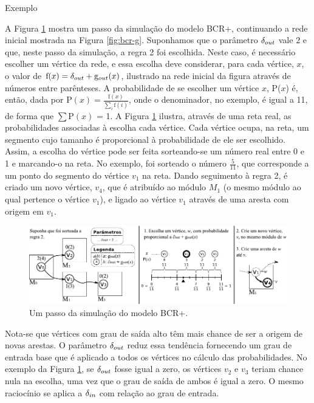 \begin{section}{Exemplo}

A Figura \ref{fig:bcr-passo} mostra um passo da simulação do modelo BCR+, continuando a rede inicial mostrada na Figura \ref{fig:bcr-g}. Suponhamos que o parâmetro $\delta_{out}$ vale $2$ e que, neste passo da simulação, a regra 2 foi escolhida. Neste caso, é necessário escolher um vértice da rede, e essa escolha deve considerar, para cada vértice, $x$, o valor de $\mathrm{f}(x) = \delta_{out} + \mathrm{g}_{out}(x)$, ilustrado na rede inicial da figura através de números entre parênteses. A probabilidade de se escolher um vértice $x$, P($x$) é, então, dada por $\mathrm{P}(x) = \frac{\mathrm{f}(x)}{\sum_i \mathrm{f}(i)}$, onde o denominador, no exemplo, é igual a 11, de forma que $\sum \mathrm{P}(x)$ = 1. A Figura \ref{fig:bcr-passo} ilustra, através de uma reta real, as probabilidades associadas à escolha cada vértice. Cada vértice ocupa, na reta, um segmento cujo tamanho é proporcional à probabilidade de ele ser escolhido. Assim, a escolha do vértice pode ser feita sorteando-se um número real entre 0 e 1 e marcando-o na reta. No exemplo, foi sorteado o número $\frac{5}{11}$, que corresponde a um ponto do segmento do vértice $v_1$ na reta. Dando seguimento à regra 2, é criado um novo vértice, $v_4$, que é atribuído ao módulo $M_1$ (o mesmo módulo ao qual pertence o vértice $v_1$), e ligado ao vértice $v_1$ através de uma aresta com origem em $v_1$.


\begin{figure}[htbp]
	\centering
		\includegraphics[scale=1]{figuras/bcr-passo}
	\caption{Um passo da simulação do modelo BCR+.}
	\label{fig:bcr-passo}
\end{figure}

Nota-se que vértices com grau de saída alto têm mais chance de ser a origem de novas arestas. O parâmetro $\delta_{out}$ reduz essa tendência fornecendo um grau de entrada base que é aplicado a todos os vértices no cálculo das probabilidades. No exemplo da Figura \ref{fig:bcr-passo}, se $\delta_{out}$ fosse igual a zero, os vértices $v_2$ e $v_3$ teriam chance nula na escolha, uma vez que o grau de saída de ambos é igual a zero. O mesmo raciocínio se aplica a $\delta_{in}$ com relação ao grau de entrada.


\end{section}
